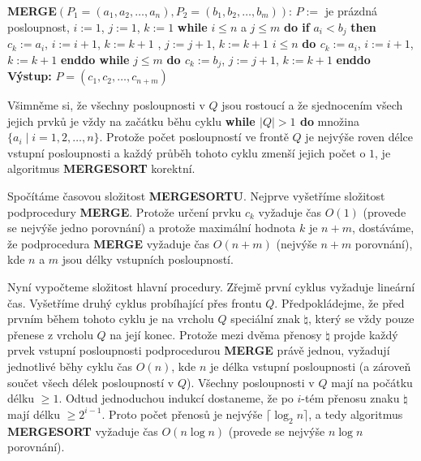 \documentclass[a4paper,12pt]{article}
\begin{document}
{\bf MERGE$(P_1=(a_1,a_2,\dots,a_n),P_2=(b_1,b_2,\dots,b_m))$}:\newline 
$P:=$ je prázdná posloupnost, $i:=1$, $j:=1$, $k:=1$\newline 
{\bf while} $i\le n$ a $j\le m$ {\bf do\newline 
\phantom{{\rm ---}}if} $a_i<b_j$ {\bf then\newline 
\phantom{{\rm ------}}$c_k:=a_i$}, $i:=i+1$, $k:=k+1$\newline 
{}, $j:=j+1$, $k:=k+1$\newline 
\phantom{---}{\bf endif\newline 
enddo\newline 
while} $i\le n$ {\bf do\newline 
\phantom{{\rm ---}}$c_k:=a_i$}, $i:=i+1$, $k:=k+1$\newline 
{\bf enddo\newline 
while} $j\le m$ {\bf do\newline 
\phantom{{\rm ---}}$c_k:=b_j$}, $j:=j+1$, $k:=k+1$\newline 
{\bf enddo\newline 
Výstup:} $P=(c_1,c_2,\dots,c_{n+m})$

Všimněme si, že všechny posloupnosti v $Q$ jsou 
rostoucí a že sjednocením všech jejich prvků  
je vždy na začátku běhu cyklu {\bf while 
$|Q|>1$ do} množina $\{a_i\mid i=1,2,\dots,n\}$. 
Protože počet 
posloupností ve frontě $Q$ je nejvýše roven délce vstupní 
posloupnosti a každý průběh tohoto 
cyklu zmenší jejich počet o $1$, je algoritmus {\bf MERGE\-SORT} korektní.

Spočítáme časovou složitost {\bf MERGESORTU}. 
Nejprve vyšetříme slo\-ži\-tost podprocedury {\bf MER\-GE}. Protože 
určení prvku $c_k$ vyža\-du\-je čas $O(1)$ (provede se 
nejvýše jedno porovnání) a 
protože maximální hodnota $k$ je $n+m$, dostáváme, že 
podprocedura {\bf MERGE} vyžaduje čas $O(n+m)$ (nejvýše $
n+m$ 
porovnání), kde $n$ a $m$ jsou délky vstupních posloupností.

Nyní vypočteme složitost hlavní procedury. 
Zřejmě první cyklus vyžaduje lineární čas. Vyšetříme 
druhý cyklus probíhající přes frontu $Q$. Předpokládejme, že před prvním během 
tohoto cyklu je na vrcholu $Q$ speciální znak $\natural$, který se vždy 
pouze přenese z vrcholu $Q$ na její konec. Protože mezi dvěma 
přenosy $\natural$ projde každý prvek vstupní posloupnosti 
podprocedurou {\bf MERGE} právě jednou, vyžadují jednotlivé běhy cyklu 
čas $O(n)$, kde 
$n$ je délka vstupní posloupnosti (a zároveň součet všech délek 
posloupností v $Q$). Všech\-ny posloupnosti v $Q$ mají  
na počátku délku $\ge 1$. Odtud jednoduchou indukcí 
dostaneme, že po $i$-tém přenosu znaku $\natural$ mají 
délku $\ge 2^{i-1}$. Proto počet přenosů je 
nejvýše $\lceil\log_2n\rceil$, a tedy algoritmus {\bf MERGESORT }
vyžaduje čas $O(n\log n)$ (provede se nejvýše $n\log n$ 
porovnání).
\end{document}
